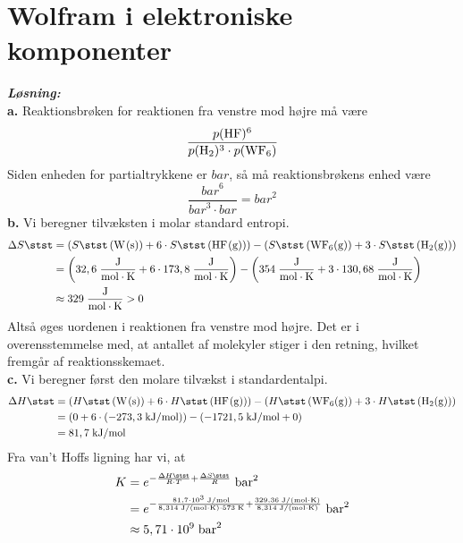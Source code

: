 \documentclass{report}
\newcommand{\sol}{\setlength{\parindent}{0cm}\textbf{\textit{Løsning:}}\setlength{\parindent}{1cm}}
\begin{document}
\section*{Wolfram i elektroniske komponenter}
\sol \\
\textbf{a.}
Reaktionsbrøken for reaktionen fra venstre mod højre må være
\begin{equation*}
\begin{split}
  \frac{p(\ce{HF} )^6}{p(\ce{ H2})^3 \cdot p(\ce{WF6} )}
\end{split}
\end{equation*}
Siden enheden for partialtrykkene er $\unit{bar}$, så må reaktionsbrøkens enhed være
\[
\frac{\unit{bar}^6}{\unit{bar}^3 \cdot \unit{bar}}=\unit{bar}^2
\] 
\textbf{b.}
Vi beregner tilvæksten i molar standard entropi.
\begin{equation*}
\begin{split}
  \Delta S \stst &=\left(S \stst \left(\ce{W(s)} \right) + 6 \cdot S \stst \left(\ce{HF(g)} \right) \right) - \left(S \stst \left(\ce{WF6(g)} \right) +3 \cdot S \stst \left(\ce{H2(g)} \right) \right) \\
  &=\left(32,6 \;\unit{\frac{J}{mol \cdot K}} + 6 \cdot 173,8 \;\unit{\frac{J}{mol \cdot K}} \right) - \left(354 \;\unit{\frac{J}{mol \cdot K}} +3 \cdot 130,68 \;\unit{\frac{J}{mol \cdot K}} \right) \\
  &\approx 329 \;\unit{\frac{J}{mol \cdot K}} >0
\end{split}
\end{equation*}
Altså øges uordenen i reaktionen fra venstre mod højre.
Det er i overensstemmelse med, at antallet af molekyler stiger i den retning, hvilket fremgår af reaktionsskemaet.\\[1ex]
\textbf{c.}
Vi beregner først den molare tilvækst i standardentalpi.
\begin{equation*}
\begin{split}
  \Delta H \stst &=\left(H \stst \left(\ce{W(s)} \right) + 6 \cdot H \stst \left(\ce{HF(g)} \right) \right) - \left(H \stst \left(\ce{WF6(g)} \right) +3 \cdot H \stst \left(\ce{H2(g)} \right) \right) \\
  &=\left(0+6 \cdot (-273,3 \;\unit{kJ/mol}) \right) -\left(-1721,5 \;\unit{kJ/mol} +0\right) \\
  &=81,7 \;\unit{kJ/mol} 
\end{split}
\end{equation*}
Fra van't Hoffs ligning har vi, at
\begin{equation*}
\begin{split}
  K&=e^{-\frac{\Delta H \stst }{R \cdot T} + \frac{\Delta S \stst }{R}} \;\unit{bar^2} \\
  &=e^{-\frac{81,7 \cdot 10^3 \;\unit{J/mol} }{8,314 \;\unit{J/(mol \cdot K)} \cdot 573 \;\unit{K} }+\frac{329,36 \;\unit{J/(mol \cdot K)} }{8,314 \;\unit{J/(mol \cdot K)} }} \;\unit{bar^2} \\
  &\approx 5,71 \cdot 10^9 \;\unit{bar^2} 
\end{split}
\end{equation*}
\end{document}
